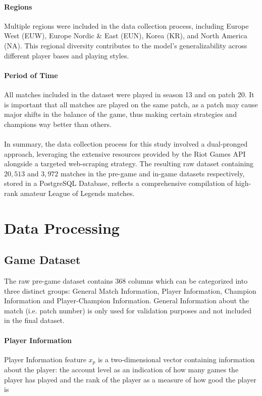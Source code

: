 \documentclass[12pt, a4paper, headinclude, twoside, plainheadsepline, open=right, numbers=noenddot, hidelinks, toc=listof, toc=bibliography]{scrreprt}
\begin{document}
\paragraph{Regions}
Multiple regions were included in the data collection process, including Europe West (EUW), Europe Nordic \& East (EUN), Korea (KR), and North America (NA).
This regional diversity contributes to the model's generalizability across different player bases and playing styles.
\paragraph{Period of Time}
All matches included in the dataset were played in season 13 and on patch 20.
It is important that all matches are played on the same patch, as a patch may cause major shifts in the balance of the game, thus making certain strategies and champions way better than others.
\\ \  \\
In summary, the data collection process for this study involved a dual-pronged approach, leveraging the extensive resources provided by the Riot Games API alongside a targeted web-scraping strategy.
The resulting raw dataset containing $20,513$ and  $3,972$ matches in the pre-game and in-game datasets respectively, stored in a PostgreSQL Database, reflects a comprehensive compilation of high-rank amateur League of Legends matches.


\section{Data Processing}
\label{sec:data_processing}

\subsection{Game Dataset}
The raw pre-game dataset contains $368$ columns which can be categorized into three distinct groups: General Match Information, Player Information, Champion Information and Player-Champion Information.
General Information about the match (i.e. patch number) is only used for validation purposes and not included in the final dataset.
\paragraph{Player Information}
Player Information feature $x_p$ is a two-dimensional vector containing information about the player: the account level as an indication of how many games the player has played and the rank of the player as a measure of how good the player is
\end{document}
